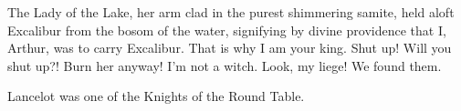 The Lady of the Lake, her arm clad in the purest shimmering samite,
held aloft Excalibur from the bosom of the water,
signifying by divine providence that I, Arthur,
was to carry Excalibur.
That is why I am your king. Shut up! Will you shut up?!
Burn her anyway! I’m not a witch.
Look, my liege! We found them.

Lancelot was one  of the Knights of the Round Table.
